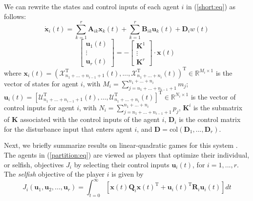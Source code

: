 \documentclass[12pt, draftclsnofoot,onecolumn]{IEEEtran}
\begin{document}
We can rewrite the states and control inputs of each agent $i$ in (\ref{short:eq}) as follows:
\begin{equation}
\dot{ \boldsymbol x}_i(t)= \sum_{k=1}^{r}{ \boldsymbol A_{ik} \boldsymbol x_k(t) } + \sum_{k=1}^{r}{ \boldsymbol B_{ik} \boldsymbol u_k(t)} + \boldsymbol D_i w(t)
\label{big:eq}
\end{equation}
\begin{equation}
\begin{bmatrix}{\boldsymbol u}_1(t)\\ \vdots \\{\boldsymbol u}_r(t) \end{bmatrix}
 = -\begin{bmatrix} {\boldsymbol K}^1 \\ \vdots \\ {\boldsymbol K}^r \end{bmatrix}\cdot {\boldsymbol x}(t)
 \label{K^i:eq}
\end{equation}
\noindent where ${\boldsymbol x}_i(t) = ({\mathcal X}^{\mathrm{T}}_{n_1+...+n_{i-1}+1}(t),..., {\mathcal X}^{\mathrm{T}}_{n_1+...+n_i}(t))^{\mathrm{T}}$$ \in \mathbb{R}^{M_i\times 1}$ is the vector of states for agent $i$, with $ M_i \allowbreak =\allowbreak \sum_{j=n_1 +... +n_{i-1}+1}^{n_1+...+n_i}{m_j}$; ${\boldsymbol u}_i(t)\allowbreak {=}\allowbreak[{\mathcal U}^{\mathrm{T}}_{n_1{+}...{+}n_{i-1}{+}1}(t),\allowbreak \hdots, {\mathcal U}^{\mathrm{T}}_{n_1{+}...{+}n_i}(t)]^{\mathrm{T}} \in \mathbb{R}^{N_i\times 1}$ is the vector of control inputs for agent $i$, with $N_i {=} \sum_{j=n_1+...+n_{i-1}+1}^{n_1+...+n_i}{p_j}$, ${\boldsymbol K}^i$ is the submatrix of ${\boldsymbol K}$ associated with the control inputs of the agent $i$, $\boldsymbol D_i$ is the control matrix for the disturbance input that enters agent $i$, and $\boldsymbol D=\mathrm{col}(\boldsymbol D_1,...,\boldsymbol D_r)$.


Next, we briefly summarize results on linear-quadratic games for this system \cite{basar85,Mukaidani2006}. The agents in (\ref{partition:eq}) are viewed as players that optimize their individual, or selfish, objectives $J_i$ by selecting their control inputs ${\boldsymbol u}_i(t)$, for $i=1,...,r$. The {\it selfish} objective of the player $i$ is given by
\begin{equation}
J_i(\boldsymbol{u}_1, {\boldsymbol u}_2,..., {\boldsymbol u}_r){=}\int_{t=0}^{\infty}{[{\boldsymbol x}(t){\boldsymbol Q}_i{\boldsymbol x}(t)^{\mathrm{T}} {+} {\boldsymbol u}_i(t)^{\mathrm{T}}{\boldsymbol R}_i {\boldsymbol u}_i(t)]dt}
\label{Ji:eq} 
\end{equation}
\end{document}
